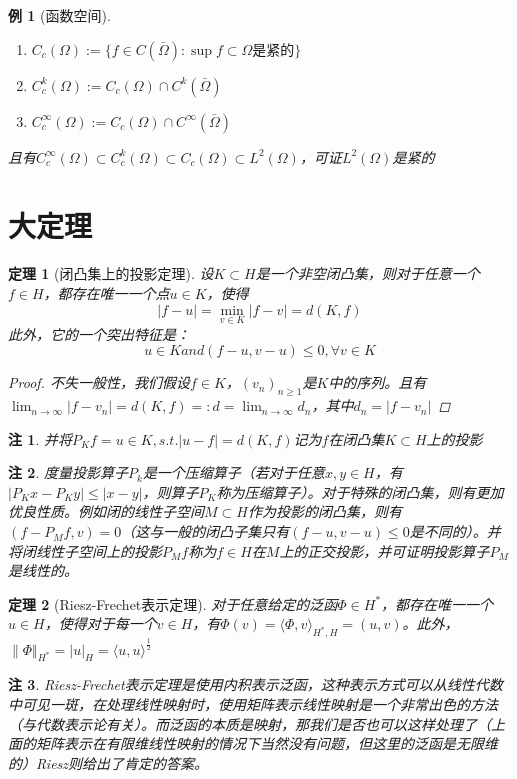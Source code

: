 \documentclass{article}                     %
\numberwithin{equation}{section}            %
\numberwithin{figure}{section}              %
\numberwithin{table}{section}               %
\newtheorem{theorem}{\indent 定理}[section] %
\newtheorem{example}{\indent 例}[section]
\newtheorem{remark}{\indent 注}[section]
\begin{document}
\begin{example}[函数空间]
    \begin{enumerate}
        \item $C_c(\Omega):=\{f\in C(\bar{\Omega} ):\sup{f}\subset \Omega\mbox{是紧的}\}$
        \item $C_c^k(\Omega):=C_c(\Omega)\cap C^k(\bar{\Omega})$
        \item $C_c^{\infty}(\Omega):=C_c(\Omega)\cap C^{\infty}(\bar{\Omega})$
    \end{enumerate}
    且有$C_c^{\infty}(\Omega)\subset C_c^k(\Omega)\subset C_c(\Omega)\subset L^2(\Omega)$，可证$L^2(\Omega)$是紧的
\end{example}


\section{大定理}
\begin{theorem}[闭凸集上的投影定理]
    设$K\subset H$是一个非空闭凸集，则对于任意一个$f\in H$，都存在唯一一个点$u\in K$，使得
    $$|f-u|=\min_{v\in K}|f-v|=d(K,f)$$
    此外，它的一个突出特征是：
    $$u\in K and (f-u,v-u)\le 0,\forall v\in K$$
    \begin{proof}
        不失一般性，我们假设$f\in K$，$(v_n)_{n\ge 1}$是$K$中的序列。且有$\lim_{n\to \infty}|f-v_n|=d(K,f)=:d=\lim_{n\to \infty}d_n$，其中$d_n=|f-v_n|$
    \end{proof}
\end{theorem}
\begin{remark}
    并将$P_Kf=u\in K,s.t. |u-f|=d(K,f)$记为$f$在闭凸集$K\subset H$上的投影
\end{remark}
\begin{remark}
    度量投影算子$P_k$是一个压缩算子（若对于任意$x,y\in H$，有$|P_Kx-P_Ky|\le |x-y|$，则算子$P_K$称为压缩算子）。对于特殊的闭凸集，则有更加优良性质。例如闭的线性子空间$M\subset H$作为投影的闭凸集，则有$(f-P_Mf,v)=0$（这与一般的闭凸子集只有$(f-u,v-u)\le 0$是不同的）。并将闭线性子空间上的投影$P_Mf$称为$f\in H$在$M$上的正交投影，并可证明投影算子$P_M$是线性的。
\end{remark}








\begin{theorem}[Riesz-Frechet表示定理]
    对于任意给定的泛函$\varPhi \in H^{\ast}$，都存在唯一一个$u\in H$，使得对于每一个$v\in H$，有$\varPhi (v)=\langle \varPhi ,v\rangle_{H^{\ast},H}=(u,v) $。此外，$\| \varPhi \Vert_{H^{\ast}}=|u|_H =\langle u,u\rangle^{\frac{1}{2}} $
\end{theorem}
\begin{remark}
    Riesz-Frechet表示定理是使用内积表示泛函，这种表示方式可以从线性代数中可见一斑，在处理线性映射时，使用矩阵表示线性映射是一个非常出色的方法（与代数表示论有关）。而泛函的本质是映射，那我们是否也可以这样处理了（上面的矩阵表示在有限维线性映射的情况下当然没有问题，但这里的泛函是无限维的）Riesz则给出了肯定的答案。
\end{remark}
\end{document}
